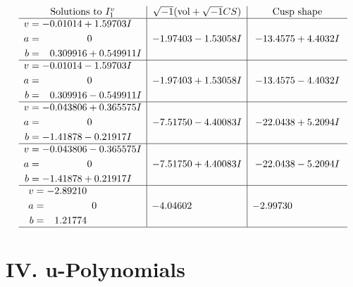 \documentclass[1p]{elsarticle_modified}
\theoremstyle{definition}
\newcommand{\I}{\sqrt{-1}}
\begin{document}
$$\begin{array}{c|c|c}  
\text{Solutions to }I^v_{1}& \I (\text{vol} + \sqrt{-1}CS) & \text{Cusp shape}\\
 \hline 
\begin{aligned}
v &= -0.01014 + 1.59703 I \\
a &= \phantom{-0.000000 } 0 \\
b &= \phantom{-}0.309916 + 0.549911 I\end{aligned}
 & -1.97403 - 1.53058 I & -13.4575 + 4.4032 I \\ \hline\begin{aligned}
v &= -0.01014 - 1.59703 I \\
a &= \phantom{-0.000000 } 0 \\
b &= \phantom{-}0.309916 - 0.549911 I\end{aligned}
 & -1.97403 + 1.53058 I & -13.4575 - 4.4032 I \\ \hline\begin{aligned}
v &= -0.043806 + 0.365575 I \\
a &= \phantom{-0.000000 } 0 \\
b &= -1.41878 - 0.21917 I\end{aligned}
 & -7.51750 - 4.40083 I & -22.0438 + 5.2094 I \\ \hline\begin{aligned}
v &= -0.043806 - 0.365575 I \\
a &= \phantom{-0.000000 } 0 \\
b &= -1.41878 + 0.21917 I\end{aligned}
 & -7.51750 + 4.40083 I & -22.0438 - 5.2094 I \\ \hline\begin{aligned}
v &= -2.89210\phantom{ +0.000000I} \\
a &= \phantom{-0.000000 } 0 \\
b &= \phantom{-}1.21774\phantom{ +0.000000I}\end{aligned}
 & -4.04602\phantom{ +0.000000I} & -2.99730\phantom{ +0.000000I}\\
 \hline 
 \end{array}$$\newpage
\newpage\renewcommand{\arraystretch}{1}
\centering \section*{ IV. u-Polynomials}
\end{document}
